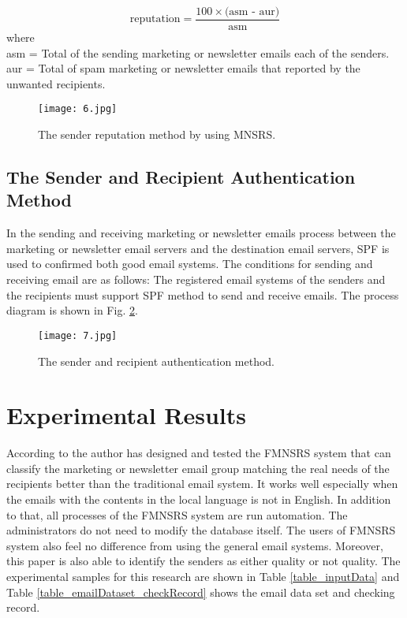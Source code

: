 \documentclass[conference]{IEEEtran}
\begin{document}
$$ \text{reputation} =  \frac{ 100\times{\text{(asm - aur)}}}{\text{asm}} $$
where\mbox{ }\\
asm = Total of the sending marketing or newsletter emails each of the senders.\\
aur = Total of spam  marketing or newsletter emails that reported by the unwanted recipients.


\begin{figure}
\centering
\texttt{[image: 6.jpg]}
\caption{The sender reputation method by using MNSRS.}
\label{fig:ReputationMethod}
\end{figure}

\subsection{The Sender and Recipient Authentication Method}
In the sending and receiving marketing or newsletter emails process between the marketing or newsletter email servers and the destination email servers, SPF \cite{wong,NguyenTuanAnh,Seike} is used to confirmed both good email systems.
The conditions for sending and receiving email are as follows:
The registered email systems of the senders and the recipients must support SPF method to send and receive emails.
The process diagram is shown in Fig. \ref{fig:AuthenticationMethod}.

\begin{figure}
\centering
\texttt{[image: 7.jpg]}
\caption{The sender and recipient authentication method.}
\label{fig:AuthenticationMethod}
\end{figure}


\section{Experimental Results}
According to the author has designed and tested the FMNSRS system that can classify the marketing or newsletter email group matching the real needs of the recipients better than the traditional email system.
It works well especially when the emails with the
contents in the local language is not in English.
In addition to that, all processes of the FMNSRS system are run automation.
The administrators do not need to modify the database itself. 
The users of FMNSRS system also feel no difference from using the general email systems. 
Moreover, this paper is also able to identify the senders as either quality or not quality.
The experimental samples for this research are shown in Table \ref{table_inputData} and Table \ref{table_emailDataset_checkRecord} shows the email data set and checking record.
\end{document}
